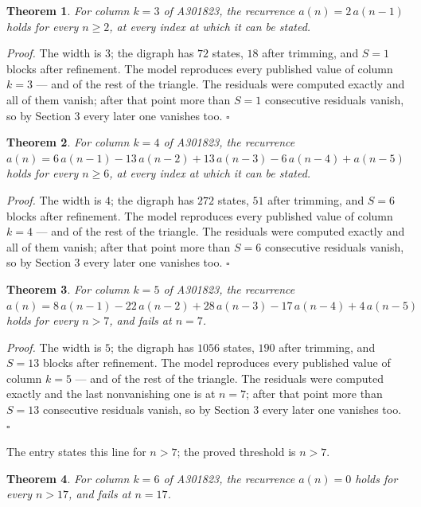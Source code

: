 \documentclass[11pt]{article}
\newtheorem{theorem}{Theorem}
\theoremstyle{definition}
\begin{document}
\begin{theorem} For column $k = 3$ of A301823, the recurrence $a(n) = 2\,a(n-1)$ holds for every $n \ge 2$, at every index at which it can be stated.\end{theorem}

{\itshape Proof.} The width is $3$; the digraph has $72$ states, $18$ after trimming, and $S = 1$ blocks after refinement. The model reproduces every published value of column $k = 3$ --- and of the rest of the triangle. The residuals were computed exactly and all of them vanish; after that point more than $S = 1$ consecutive residuals vanish, so by Section 3 every later one vanishes too. $\square$

\begin{theorem} For column $k = 4$ of A301823, the recurrence $a(n) = 6\,a(n-1) - 13\,a(n-2) + 13\,a(n-3) - 6\,a(n-4) + a(n-5)$ holds for every $n \ge 6$, at every index at which it can be stated.\end{theorem}

{\itshape Proof.} The width is $4$; the digraph has $272$ states, $51$ after trimming, and $S = 6$ blocks after refinement. The model reproduces every published value of column $k = 4$ --- and of the rest of the triangle. The residuals were computed exactly and all of them vanish; after that point more than $S = 6$ consecutive residuals vanish, so by Section 3 every later one vanishes too. $\square$

\begin{theorem} For column $k = 5$ of A301823, the recurrence $a(n) = 8\,a(n-1) - 22\,a(n-2) + 28\,a(n-3) - 17\,a(n-4) + 4\,a(n-5)$ holds for every $n > 7$, and fails at $n = 7$.\end{theorem}

{\itshape Proof.} The width is $5$; the digraph has $1056$ states, $190$ after trimming, and $S = 13$ blocks after refinement. The model reproduces every published value of column $k = 5$ --- and of the rest of the triangle. The residuals were computed exactly and the last nonvanishing one is at $n = 7$; after that point more than $S = 13$ consecutive residuals vanish, so by Section 3 every later one vanishes too. $\square$

The entry states this line for $n > 7$; the proved threshold is $n > 7$.

\begin{theorem} For column $k = 6$ of A301823, the recurrence $a(n) = 0$ holds for every $n > 17$, and fails at $n = 17$.\end{theorem}
\end{document}
